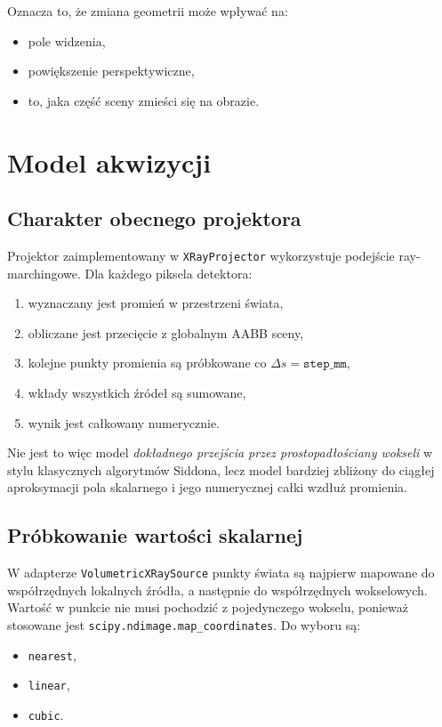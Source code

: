 \documentclass[12pt,a4paper]{article}
\begin{document}
Oznacza to, że zmiana geometrii może wpływać na:
\begin{itemize}
  \item pole widzenia,
  \item powiększenie perspektywiczne,
  \item to, jaka część sceny zmieści się na obrazie.
\end{itemize}

\section{Model akwizycji}

\subsection{Charakter obecnego projektora}

Projektor zaimplementowany w \texttt{XRayProjector} wykorzystuje podejście
ray-marchingowe. Dla każdego piksela detektora:
\begin{enumerate}[label=\arabic*.]
  \item wyznaczany jest promień w przestrzeni świata,
  \item obliczane jest przecięcie z globalnym AABB sceny,
  \item kolejne punkty promienia są próbkowane co \(\Delta s = \texttt{step\_mm}\),
  \item wkłady wszystkich źródeł są sumowane,
  \item wynik jest całkowany numerycznie.
\end{enumerate}

Nie jest to więc model \emph{dokładnego przejścia przez prostopadłościany wokseli}
w stylu klasycznych algorytmów Siddona, lecz model bardziej zbliżony do ciągłej
aproksymacji pola skalarnego i jego numerycznej całki wzdłuż promienia.

\subsection{Próbkowanie wartości skalarnej}

W adapterze \texttt{VolumetricXRaySource} punkty świata są najpierw mapowane do
współrzędnych lokalnych źródła, a następnie do współrzędnych wokselowych. Wartość
w punkcie nie musi pochodzić z pojedynczego wokselu, ponieważ stosowane jest
\texttt{scipy.ndimage.map\_coordinates}. Do wyboru są:
\begin{itemize}
  \item \texttt{nearest},
  \item \texttt{linear},
  \item \texttt{cubic}.
\end{itemize}
\end{document}
